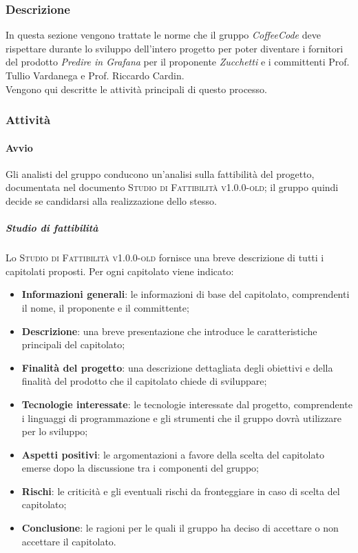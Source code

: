 \documentclass[../norme-di-progetto.tex]{subfiles}
\begin{document}
\subsubsection{Descrizione}
In questa sezione vengono trattate le norme che il gruppo \emph{CoffeeCode} deve rispettare durante lo sviluppo dell'intero progetto per poter diventare i fornitori del prodotto \emph{Predire in Grafana} per il proponente \emph{Zucchetti} e i committenti Prof. Tullio Vardanega e Prof. Riccardo Cardin. \\
Vengono qui descritte le attività principali di questo processo.

\subsubsection{Attività}

\paragraph{Avvio}
Gli analisti del gruppo conducono un'analisi sulla fattibilità del progetto, documentata nel documento \textsc{Studio di Fattibilità v1.0.0-old}; il gruppo quindi decide se candidarsi alla realizzazione dello stesso.
\subparagraph*{Studio di fattibilità}
Lo \textsc{Studio di Fattibilità v1.0.0-old} fornisce una breve descrizione di tutti i capitolati proposti. Per ogni capitolato viene indicato:
\begin{itemize}
  \item \textbf{Informazioni generali}: le informazioni di base del capitolato, comprendenti il nome, il proponente e il committente;
  \item \textbf{Descrizione}: una breve presentazione che introduce le caratteristiche principali del capitolato;
  \item \textbf{Finalità del progetto}: una descrizione dettagliata degli obiettivi e della finalità del prodotto che il capitolato chiede di sviluppare;
  \item \textbf{Tecnologie interessate}: le tecnologie interessate dal progetto, comprendente i linguaggi di programmazione e gli strumenti che il gruppo dovrà utilizzare per lo sviluppo;
  \item \textbf{Aspetti positivi}: le argomentazioni a favore della scelta del capitolato emerse dopo la discussione tra i componenti del gruppo;
  \item \textbf{Rischi}: le criticità e gli eventuali rischi da fronteggiare in caso di scelta del capitolato;
  \item \textbf{Conclusione}: le ragioni per le quali il gruppo ha deciso di accettare o non accettare il capitolato.
\end{itemize}
\end{document}
